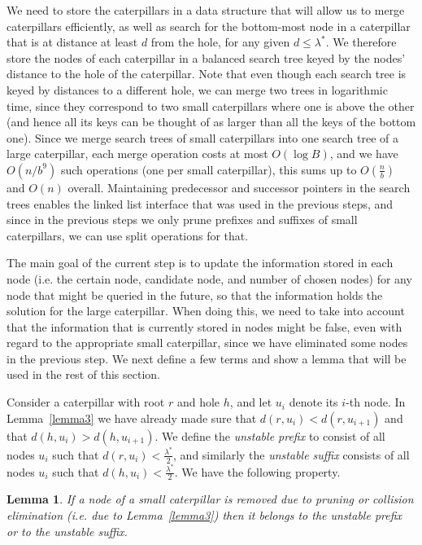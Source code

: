 \documentclass[11pt,a4paper]{article}
\newtheorem{lemma}{Lemma}
\theoremstyle{definition}
\theoremstyle{remark}
\begin{document}
We need to store the caterpillars in a data structure that will allow us to merge caterpillars efficiently, as well as search for the bottom-most node in a caterpillar that is at distance at least $d$ from the hole, for any given $d \le \lambda^*$. 
We therefore store the nodes of each caterpillar in a balanced search tree keyed by the nodes' distance to the hole of the caterpillar. Note that even though each search tree is keyed by distances to a different hole, we can merge two trees in logarithmic time, since they correspond to two small caterpillars where one is above the other (and hence all its keys can be thought of as larger than all the keys of the bottom one). Since we merge search trees of small caterpillars into one  search tree of a large caterpillar, each merge operation costs at most $O(\log B)$, and we have $O(n/b^9)$ such operations (one per small caterpillar), this sums up to $O(\frac{n}{b})$ and $O(n)$ overall.
Maintaining predecessor and successor pointers in the search trees enables the linked list interface that was used in the previous steps, and since in the previous steps we only prune prefixes and suffixes of small caterpillars, we can use split operations for that.

The main goal of the current step is to update the information stored in each node (i.e. the certain node, candidate node, and number of chosen nodes) for any node that might be queried in the future, so that the information holds the solution for the large caterpillar. When doing this, we need to take into account that the information that is currently stored in nodes might be false, even with regard to the appropriate small caterpillar, since we have eliminated some nodes in the previous step.
We next define a few terms and show a lemma that will be used in the rest of this section.

\vspace{0.04in}  
Consider a caterpillar with root $r$ and hole $h$, and let $u_{i}$ denote its $i$-th node. In Lemma~\ref{lemma3} we have already made sure that $d(r,u_{i}) < d(r,u_{i+1})$
and that $d(h,u_{i}) > d(h,u_{i+1})$. We define the \emph{unstable prefix} to
consist of all nodes $u_{i}$ such that $d(r,u_{i}) < \frac{\lambda^{*}}{2}$, and similarly the
\emph{unstable suffix} consists of all nodes $u_{i}$ such that $d(h,u_{i}) < \frac{\lambda^{*}}{2}$.
We have the following property.

\begin{lemma}
\label{stable infix}
If a node of a small caterpillar is removed due to pruning or collision elimination (i.e. due to Lemma~\ref{lemma3}) then it
belongs to the unstable prefix or to the unstable suffix.
\end{lemma}
\end{document}
